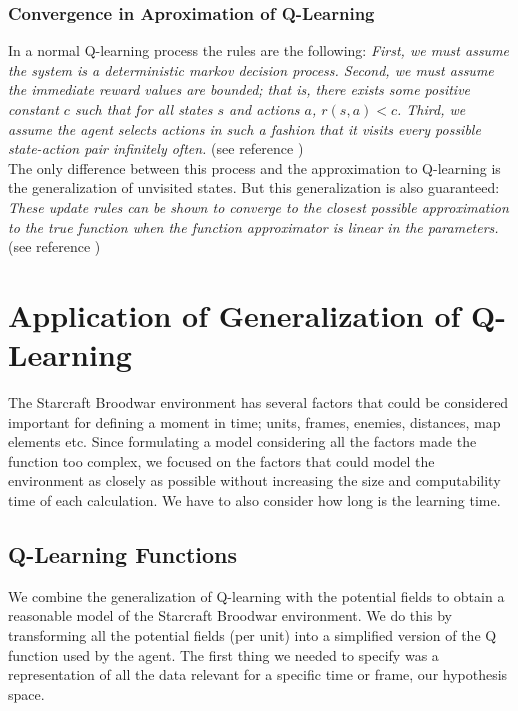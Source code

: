 \subsubsection{Convergence in Aproximation of Q-Learning}\label{convergence}

In a normal Q-learning process the rules are the following: \textit{First, we must assume the system is a deterministic markov decision process. Second, we must assume the immediate reward values are bounded; that is, there exists some positive constant $c$ such that for all states $s$ and actions $a$, $r(s,a) < c$. Third, we assume the agent selects actions in such a fashion that it visits every possible state-action pair infinitely often.}  (see reference \cite[p377]{ml_tom_mitchel}) \\


The only difference between this process and the approximation to Q-learning is the generalization of unvisited states. But this generalization is also guaranteed: \textit{These update rules can be shown to converge to the closest possible approximation to the true function when the function approximator is linear in the parameters. } (see reference \cite[p779]{rl})



\section{Application of Generalization of Q-Learning}	\label{qlearning}

The Starcraft Broodwar environment has several factors that could be considered important for defining a moment in time; units, frames, enemies, distances, map elements etc. Since formulating a model considering all the factors made the function too complex, we focused on the factors that could model the environment as closely as possible without increasing the size and computability time of each calculation. We have to also consider how long is the learning time. 

\subsection{Q-Learning Functions}

We combine the generalization of Q-learning with the potential fields to obtain a reasonable model of the Starcraft Broodwar environment. We do this by transforming all the potential fields (per unit) into a simplified version of the Q function used by the agent. The first thing we needed to specify was a representation of all the data relevant for a specific time or frame, our hypothesis space. 

